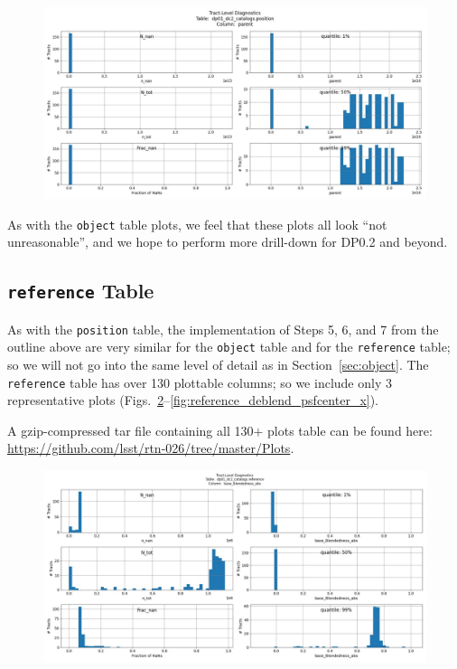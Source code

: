 \documentclass[DM,authoryear,toc]{lsstdoc}
\begin{document}
\begin{figure}[h]
\centering
\includegraphics[width=1.0\linewidth]{Plots/position_parent.pdf}
\caption{}
\label{fig:position_parent}
\end{figure}


As with the \texttt{object} table plots, we feel that these plots all
look ``not unreasonable'', and we hope to perform more drill-down for
DP0.2 and beyond.





\subsection{\texttt{reference} Table} \label{sec:reference}

As with the \texttt{position} table, the implementation of Steps 5, 6,
and 7 from the outline above are very similar for the \texttt{object}
table and for the \texttt{reference} table; so we will not go into the
same level of detail as in Section~\ref{sec:object}.  The
\texttt{reference} table has over 130 plottable columns; so we
include only 3 representative plots
(Figs.~\ref{fig:reference_base_blendednes_abs}--\ref{fig:reference_deblend_psfcenter_x}).

A gzip-compressed tar file containing all 130$+$ plots table can be
found here: \url{https://github.com/lsst/rtn-026/tree/master/Plots}.


\begin{figure}[h]
\centering
\includegraphics[width=1.0\linewidth]{Plots/reference_base_Blendedness_abs.pdf}
\caption{}
\label{fig:reference_base_blendednes_abs}
\end{figure}
\end{document}
